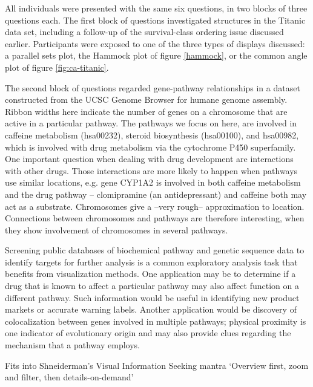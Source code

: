  All individuals were presented with the same six questions, in two blocks of three questions each. The first block of questions investigated structures in the Titanic data set, including a follow-up of the survival-class ordering issue discussed earlier. Participants were exposed to one of the three types of displays discussed: a parallel sets plot, the Hammock plot of figure \ref{hammock}, or the common angle plot of  figure \ref{fig:ca-titanic}.
 
The second block  of questions regarded gene-pathway relationships in a dataset constructed from the UCSC Genome Browser \cite{ucsc:2002} for humane genome assembly. Ribbon widths here indicate the number of genes on a  chromosome that are active in a particular pathway. The pathways we focus on here, are involved in caffeine metabolism (hsa00232),  steroid biosynthesis (hsa00100), and hsa00982, which is involved with drug metabolism via the cytochrome P450 superfamily.  One important question when dealing with drug development are interactions with other drugs. Those interactions are more likely to happen when pathways use similar locations, e.g. gene CYP1A2 is involved in both  caffeine metabolism and the drug pathway -- clomipramine (an antidepressant) and caffeine both may act as a substrate. Chromosomes give a --very rough-- approximation to location. Connections between chromosomes and pathways are therefore interesting, when they show involvement of chromosomes in several pathways.
 


Screening public databases of biochemical pathway and genetic sequence data to identify targets for further analysis is a common exploratory analysis task that benefits from visualization methods. One application may be to determine if a drug that is known to affect a particular pathway may also affect function on a different pathway. Such information would be useful in identifying new product markets or accurate warning labels. Another application would be discovery of colocalization between genes involved in multiple pathways; physical proximity is one indicator of evolutionary origin and may also provide clues regarding the mechanism that a pathway employs.
 
 Fits into Shneiderman's Visual Information Seeking mantra `Overview first, zoom and filter, then details-on-demand' \cite{shneiderman:1996}
 
